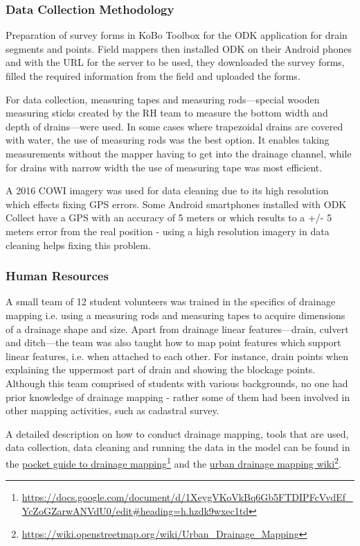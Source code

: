 \documentclass[a4paper,12pt,twoside]{article}
\begin{document}
\subsubsection{Data Collection Methodology}
\begin{multicols}{2}
Preparation of survey forms in KoBo Toolbox for the ODK application for drain segments and points. Field mappers then installed ODK on their Android phones and with the URL for the server to be used, they downloaded the survey forms, filled the required information from the field and uploaded the forms.

For data collection, measuring tapes and measuring rods---special wooden measuring sticks created by the RH team to measure the bottom width and depth of drains---were used. In some cases where trapezoidal drains are covered with water, the use of measuring rods was the best option. It enables taking measurements without the mapper having to get into the drainage channel, while for drains with narrow width the use of measuring tape was most efficient.

A 2016 COWI imagery was used for data cleaning due to its high resolution which effects fixing GPS errors. Some Android smartphones installed with ODK Collect have a GPS with an accuracy of 5 meters or which results to a +/- 5 meters error from the real position - using a high resolution imagery in data cleaning helps fixing this problem.
\end{multicols}


\subsubsection{Human Resources}
A small team of 12 student volunteers was trained in the specifics of drainage mapping i.e. using a measuring rods and measuring tapes to acquire dimensions of a drainage shape and size. Apart from drainage linear features---drain, culvert and ditch---the team was also taught how to map point features which support linear features, i.e. when attached to each other. For instance, drain points when explaining the uppermost part of drain and showing the blockage points. Although this team comprised of students with various backgrounds, no one had prior knowledge of drainage mapping - rather some of them had been involved in other mapping activities, such as cadastral survey.

A detailed description on how to conduct drainage mapping, tools that are used, data collection, data cleaning and running the data in the model can be found in the \href{https://docs.google.com/document/d/1XeygVKoVkBq6Gb5FTDIPFcVvdEf_YcZoGZarwANVdU0/edit#heading=h.hzdk9wxec1td}{pocket guide to drainage mapping}\footnote{\url{https://docs.google.com/document/d/1XeygVKoVkBq6Gb5FTDIPFcVvdEf_YcZoGZarwANVdU0/edit#heading=h.hzdk9wxec1td}} and the \href{https://wiki.openstreetmap.org/wiki/Urban_Drainage_Mapping}{urban drainage mapping wiki}\footnote{\url{https://wiki.openstreetmap.org/wiki/Urban_Drainage_Mapping}}.
\end{document}
